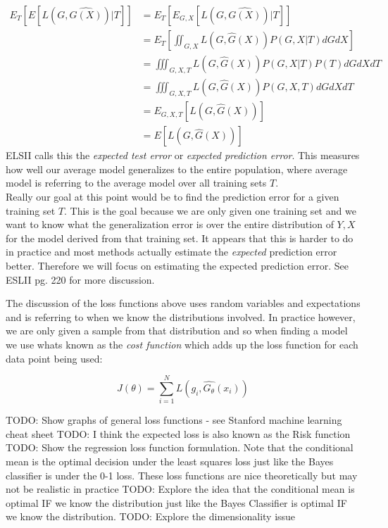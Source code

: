 \documentclass[paper=a4, fontsize=11pt]{scrartcl} %
\numberwithin{equation}{section} %
\numberwithin{figure}{section} %
\numberwithin{table}{section} %
\begin{document}
\begin{equation}
\begin{split}
E_{T}[E[L(G, \hat{G(X)})|T]] &= E_{T}[E_{G,X}[L(G, \hat{G(X)})|T]] \\
&= E_{T}\left[\iint_{G, X} {L(G, \hat{G}(X)) P(G,X|T) dG dX}\right]\\
&= \iiint_{G, X, T} {L(G, \hat{G}(X)) P(G,X|T) P(T) dG dX dT} \\
&= \iiint_{G, X, T} {L(G, \hat{G}(X)) P(G,X,T) dG dX dT}\\
&= E_{G,X,T}[L(G, \hat{G}(X))]\\
&= E[L(G, \hat{G}(X))]
\end{split}
\end{equation}
ELSII calls this the \emph{expected test error} or \emph{expected prediction error}. This measures how well our average model generalizes to the entire population, where average model is referring to the average model over all training sets $T$. \\

Really our goal at this point would be to find the prediction error for a given training set $T$. This is the goal because we are only given one training set and we want to know what the generalization error is over the entire distribution of $Y, X$ for the model derived from that training set. It appears that this is harder to do in practice and most methods actually estimate the \emph{expected} prediction error better. Therefore we will focus on estimating the expected prediction error. See ESLII pg. 220 for more discussion.

The discussion of the loss functions above uses random variables and expectations and is referring to when we know the distributions involved. In practice however, we are only given a sample from that distribution and so when finding a model we use whats known as the \emph{cost function} which adds up the loss function for each data point being used:

\begin{equation}
J(\theta) = \sum_{i=1}^{N}{L(g_i, \hat{G_\theta}(x_i))}
\end{equation}



\noindent TODO: Show graphs of general loss functions - see Stanford machine learning cheat sheet \newline
TODO: I think the expected loss is also known as the Risk function \newline
TODO: Show the regression loss function formulation. Note that the conditional mean is the optimal decision under the least squares loss just like the Bayes classifier is under the 0-1 loss. These loss functions are nice theoretically but may not be realistic in practice \newline
TODO: Explore the idea that the conditional mean is optimal IF we know the distribution just like the Bayes Classifier is optimal IF we know the distribution. \newline
TODO: Explore the dimensionality issue
\end{document}
